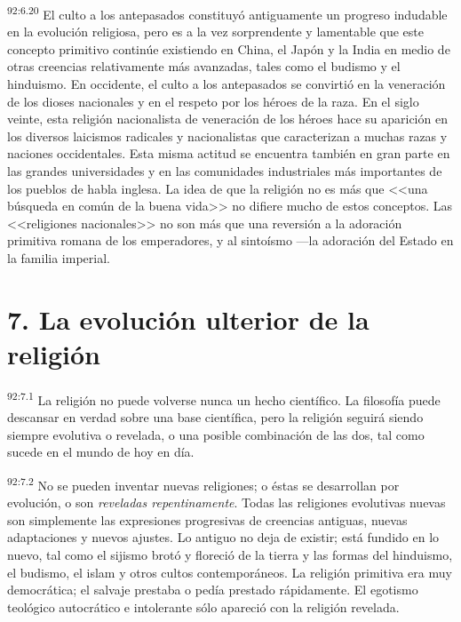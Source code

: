 \par
\textsuperscript{92:6.20} El culto a los antepasados constituyó antiguamente un progreso indudable en la evolución religiosa, pero es a la vez sorprendente y lamentable que este concepto primitivo continúe existiendo en China, el Japón y la India en medio de otras creencias relativamente más avanzadas, tales como el budismo y el hinduismo. En occidente, el culto a los antepasados se convirtió en la veneración de los dioses nacionales y en el respeto por los héroes de la raza. En el siglo veinte, esta religión nacionalista de veneración de los héroes hace su aparición en los diversos laicismos radicales y nacionalistas que caracterizan a muchas razas y naciones occidentales. Esta misma actitud se encuentra también en gran parte en las grandes universidades y en las comunidades industriales más importantes de los pueblos de habla inglesa. La idea de que la religión no es más que <<una búsqueda en común de la buena vida>> no difiere mucho de estos conceptos. Las <<religiones nacionales>> no son más que una reversión a la adoración primitiva romana de los emperadores, y al sintoísmo ---la adoración del Estado en la familia imperial.

\section*{7. La evolución ulterior de la religión}
\par
\textsuperscript{92:7.1} La religión no puede volverse nunca un hecho científico. La filosofía puede descansar en verdad sobre una base científica, pero la religión seguirá siendo siempre evolutiva o revelada, o una posible combinación de las dos, tal como sucede en el mundo de hoy en día.

\par
\textsuperscript{92:7.2} No se pueden inventar nuevas religiones; o éstas se desarrollan por evolución, o son \textit{reveladas repentinamente}. Todas las religiones evolutivas nuevas son simplemente las expresiones progresivas de creencias antiguas, nuevas adaptaciones y nuevos ajustes. Lo antiguo no deja de existir; está fundido en lo nuevo, tal como el sijismo brotó y floreció de la tierra y las formas del hinduismo, el budismo, el islam y otros cultos contemporáneos. La religión primitiva era muy democrática; el salvaje prestaba o pedía prestado rápidamente. El egotismo teológico autocrático e intolerante sólo apareció con la religión revelada.

